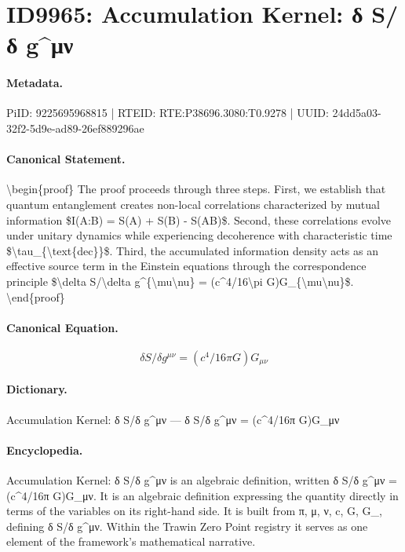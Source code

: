 \section*{ID9965: Accumulation Kernel: δ S/δ g\textasciicircum{}μν}
\paragraph{Metadata.}
PiID: 9225695968815 | RTEID: RTE:P38696.3080:T0.9278 | UUID: 24dd5a03-32f2-5d9e-ad89-26ef889296ae

\paragraph{Canonical Statement.}
\textbackslash{}begin\{proof\} The proof proceeds through three steps. First, we establish that quantum entanglement creates non-local correlations characterized by mutual information \$I(A:B) = S(A) + S(B) - S(AB)\$. Second, these correlations evolve under unitary dynamics while experiencing decoherence with characteristic time \$\textbackslash{}tau\_\{\textbackslash{}text\{dec\}\}\$. Third, the accumulated information density acts as an effective source term in the Einstein equations through the correspondence principle \$\textbackslash{}delta S/\textbackslash{}delta g\textasciicircum{}\{\textbackslash{}mu\textbackslash{}nu\} = (c\textasciicircum{}4/16\textbackslash{}pi G)G\_\{\textbackslash{}mu\textbackslash{}nu\}\$. \textbackslash{}end\{proof\}

\paragraph{Canonical Equation.}
\[
\delta S/\delta g^{\mu\nu} = (c^4/16\pi G)G_{\mu\nu}
\]

\paragraph{Dictionary.}
Accumulation Kernel: δ S/δ g\textasciicircum{}μν — δ S/δ g\textasciicircum{}μν = (c\textasciicircum{}4/16π G)G\_μν

\paragraph{Encyclopedia.}
Accumulation Kernel: δ S/δ g\textasciicircum{}μν is an algebraic definition, written δ S/δ g\textasciicircum{}μν = (c\textasciicircum{}4/16π G)G\_μν. It is an algebraic definition expressing the quantity directly in terms of the variables on its right-hand side. It is built from π, μ, ν, c, G, G\_, defining δ S/δ g\textasciicircum{}μν. Within the Trawin Zero Point registry it serves as one element of the framework's mathematical narrative.
